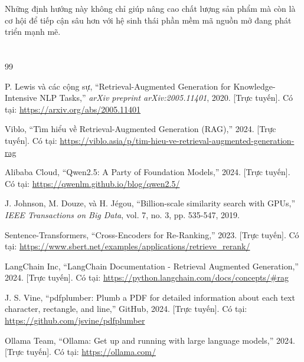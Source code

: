 ﻿\documentclass[10pt, conference, a4paper, compsocconf]{IEEEtran}
\begin{document}
Những định hướng này không chỉ giúp nâng cao chất lượng sản phẩm mà còn là cơ hội để tiếp cận sâu hơn với hệ sinh thái phần mềm mã nguồn mở đang phát triển mạnh mẽ.

\section*{}
\begin{thebibliography}{99}

P. Lewis và các cộng sự, ``Retrieval-Augmented Generation for Knowledge-Intensive NLP Tasks,'' \textit{arXiv preprint arXiv:2005.11401}, 2020. [Trực tuyến]. Có tại: \url{https://arxiv.org/abs/2005.11401}

Viblo, ``Tìm hiểu về Retrieval-Augmented Generation (RAG),'' 2024. [Trực tuyến]. Có tại: \url{https://viblo.asia/p/tim-hieu-ve-retrieval-augmented-generation-rag}

Alibaba Cloud, ``Qwen2.5: A Party of Foundation Models,'' 2024. [Trực tuyến]. Có tại: \url{https://qwenlm.github.io/blog/qwen2.5/}

J. Johnson, M. Douze, và H. Jégou, ``Billion-scale similarity search with GPUs,'' \textit{IEEE Transactions on Big Data}, vol. 7, no. 3, pp. 535-547, 2019.



Sentence-Transformers, ``Cross-Encoders for Re-Ranking,'' 2023. [Trực tuyến]. Có tại: \url{https://www.sbert.net/examples/applications/retrieve_rerank/}

LangChain Inc, ``LangChain Documentation - Retrieval Augmented Generation,'' 2024. [Trực tuyến]. Có tại: \url{https://python.langchain.com/docs/concepts/#rag}

J. S. Vine, ``pdfplumber: Plumb a PDF for detailed information about each text character, rectangle, and line,'' GitHub, 2024. [Trực tuyến]. Có tại: \url{https://github.com/jsvine/pdfplumber}

Ollama Team, ``Ollama: Get up and running with large language models,'' 2024. [Trực tuyến]. Có tại: \url{https://ollama.com/}

\end{thebibliography}
\end{document}
